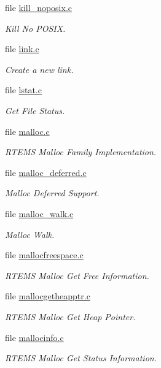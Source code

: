 \begin{DoxyCompactItemize}
file \mbox{\hyperlink{kill__noposix_8c}{kill\+\_\+noposix.\+c}}
\begin{DoxyCompactList}\small\item\em Kill No P\+O\+S\+IX. \end{DoxyCompactList}\item 
file \mbox{\hyperlink{link_8c}{link.\+c}}
\begin{DoxyCompactList}\small\item\em Create a new link. \end{DoxyCompactList}\item 
file \mbox{\hyperlink{lstat_8c}{lstat.\+c}}
\begin{DoxyCompactList}\small\item\em Get File Status. \end{DoxyCompactList}\item 
file \mbox{\hyperlink{malloc_8c}{malloc.\+c}}
\begin{DoxyCompactList}\small\item\em R\+T\+E\+MS Malloc Family Implementation. \end{DoxyCompactList}\item 
file \mbox{\hyperlink{malloc__deferred_8c}{malloc\+\_\+deferred.\+c}}
\begin{DoxyCompactList}\small\item\em Malloc Deferred Support. \end{DoxyCompactList}\item 
file \mbox{\hyperlink{malloc__walk_8c}{malloc\+\_\+walk.\+c}}
\begin{DoxyCompactList}\small\item\em Malloc Walk. \end{DoxyCompactList}\item 
file \mbox{\hyperlink{mallocfreespace_8c}{mallocfreespace.\+c}}
\begin{DoxyCompactList}\small\item\em R\+T\+E\+MS Malloc Get Free Information. \end{DoxyCompactList}\item 
file \mbox{\hyperlink{mallocgetheapptr_8c}{mallocgetheapptr.\+c}}
\begin{DoxyCompactList}\small\item\em R\+T\+E\+MS Malloc Get Heap Pointer. \end{DoxyCompactList}\item 
file \mbox{\hyperlink{mallocinfo_8c}{mallocinfo.\+c}}
\begin{DoxyCompactList}\small\item\em R\+T\+E\+MS Malloc Get Status Information. \end{DoxyCompactList}\item 

\end{DoxyCompactItemize}

